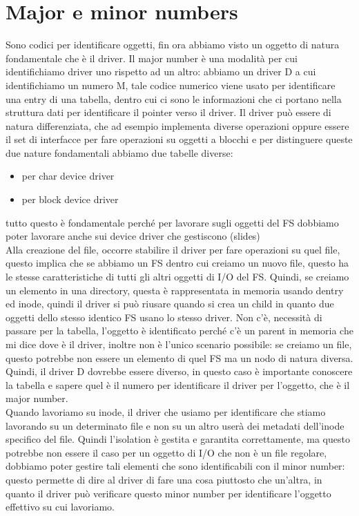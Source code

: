 \documentclass[12pt, oneside]{extbook}
\begin{document}
\section{Major e minor numbers}
Sono codici per identificare oggetti, fin ora abbiamo visto un oggetto di natura fondamentale che è il driver. Il major number è una modalità per cui identifichiamo driver uno rispetto ad un altro: abbiamo un driver D a cui identifichiamo un numero M, tale codice numerico viene usato per identificare una entry di una tabella, dentro cui ci sono le informazioni che ci portano nella struttura dati per identificare il pointer verso il driver. Il driver può essere di natura differenziata, che ad esempio implementa diverse operazioni oppure essere il set di interfacce per fare operazioni su oggetti a blocchi e per distinguere queste due nature fondamentali abbiamo due tabelle diverse:
\begin{itemize}
\item per char device driver
\item per block device driver 
\end{itemize}
tutto questo è fondamentale perché per lavorare sugli oggetti del FS dobbiamo poter lavorare anche sui device driver che gestiscono (slides)\\Alla creazione del file, occorre stabilire il driver per fare operazioni su quel file, questo implica che se abbiamo un FS dentro cui creiamo un nuovo file, questo ha le stesse caratteristiche di tutti gli altri oggetti di I/O del FS. Quindi, se creiamo un elemento in una directory, questa è rappresentata in memoria usando dentry ed inode, quindi il driver si può riusare quando si crea un child in quanto due oggetti dello stesso identico FS usano lo stesso driver. Non c'è, necessità di passare per la tabella, l'oggetto è identificato perché c'è un parent in memoria che mi dice dove è il driver, inoltre non è l'unico scenario possibile: se creiamo un file, questo potrebbe non essere un elemento di quel FS ma un nodo di natura diversa. Quindi, il driver D dovrebbe essere diverso, in questo caso è importante conoscere la tabella e sapere quel è il numero per identificare il driver per l'oggetto, che è il major number.\\Quando lavoriamo su inode, il driver che usiamo per identificare che stiamo lavorando su un determinato file e non su un altro userà dei metadati dell'inode specifico del file. Quindi l'isolation è gestita e garantita correttamente, ma questo potrebbe non essere il caso per un oggetto di I/O che non è un file regolare, dobbiamo poter gestire tali elementi che sono identificabili con il minor number: questo permette di dire al driver di fare una cosa piuttosto che un'altra, in quanto il driver può verificare questo minor number per identificare l'oggetto effettivo su cui lavoriamo.
\end{document}
